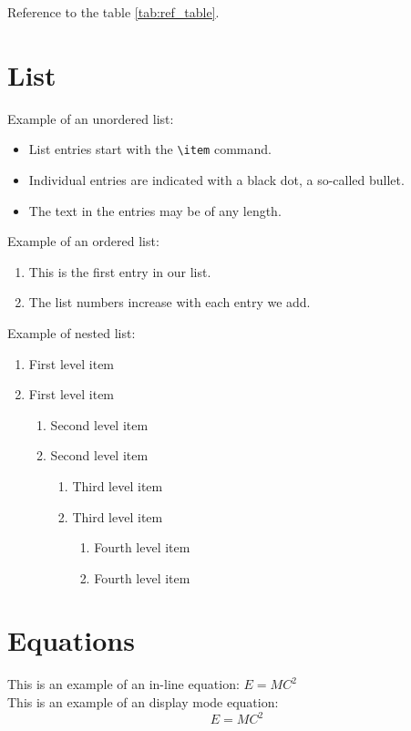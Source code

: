Reference to the table \ref{tab:ref_table}.

\section{List}
Example of an unordered list:
\begin{itemize}
  \item List entries start with the \verb|\item| command.
  \item Individual entries are indicated with a black dot, a so-called bullet.
  \item The text in the entries may be of any length.
\end{itemize}

Example of an ordered list:
\begin{enumerate}
  \item This is the first entry in our list.
  \item The list numbers increase with each entry we add.
\end{enumerate}

Example of nested list:
\begin{enumerate}
   \item First level item
   \item First level item
   \begin{enumerate}
     \item Second level item
     \item Second level item
     \begin{enumerate}
       \item Third level item
       \item Third level item
       \begin{enumerate}
         \item Fourth level item
         \item Fourth level item
       \end{enumerate}
     \end{enumerate}
   \end{enumerate}
 \end{enumerate}


\section{Equations}

This is an example of an in-line equation: $E = MC^2$\\
This is an example of an display mode equation:
\begin{equation}
    E = MC^2
\label{eq}
\end{equation}

